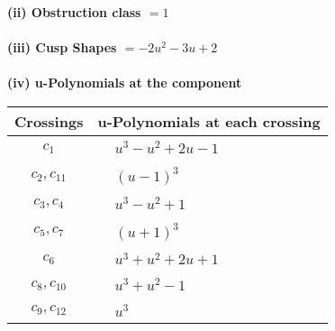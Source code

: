 \documentclass[1p]{elsarticle_modified}
\theoremstyle{definition}
\begin{document}
\flushleft \textbf{(ii) Obstruction class $= 1$}\\~\\
\flushleft \textbf{(iii) Cusp Shapes $= -2 u^2-3 u+2$}\\~\\
\newpage\renewcommand{\arraystretch}{1}
\flushleft \textbf{(iv) u-Polynomials at the component}\newline \\
\begin{tabular}{m{50pt}|m{274pt}}
Crossings & \hspace{64pt}u-Polynomials at each crossing \\
\hline $$\begin{aligned}c_{1}\end{aligned}$$&$\begin{aligned}
&u^3- u^2+2 u-1
\end{aligned}$\\
\hline $$\begin{aligned}c_{2},c_{11}\end{aligned}$$&$\begin{aligned}
&(u-1)^3
\end{aligned}$\\
\hline $$\begin{aligned}c_{3},c_{4}\end{aligned}$$&$\begin{aligned}
&u^3- u^2+1
\end{aligned}$\\
\hline $$\begin{aligned}c_{5},c_{7}\end{aligned}$$&$\begin{aligned}
&(u+1)^3
\end{aligned}$\\
\hline $$\begin{aligned}c_{6}\end{aligned}$$&$\begin{aligned}
&u^3+u^2+2 u+1
\end{aligned}$\\
\hline $$\begin{aligned}c_{8},c_{10}\end{aligned}$$&$\begin{aligned}
&u^3+u^2-1
\end{aligned}$\\
\hline $$\begin{aligned}c_{9},c_{12}\end{aligned}$$&$\begin{aligned}
&u^3
\end{aligned}$\\
\hline
\end{tabular}\\~\\
\end{document}
